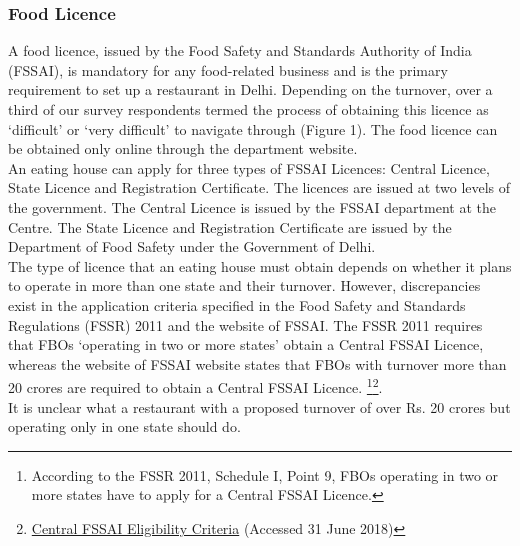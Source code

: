\documentclass[a4paper, 12pt]{article}
\begin{document}
                                        
                    \subsubsection{Food Licence}
                    A food licence, issued by the Food Safety and Standards Authority of India (FSSAI), is mandatory for any food-related business and is the primary requirement to set up a restaurant in Delhi. Depending on the turnover, over a third of our survey respondents termed the process of obtaining this licence as ‘difficult’ or ‘very difficult’ to navigate through (Figure 1). The food licence can be obtained only online through the department website.\\
                    An eating house can apply for three types of FSSAI Licences: Central Licence, State Licence and Registration Certificate. The licences are issued at two levels of the government. The Central Licence is issued by the FSSAI department at the Centre. The State Licence and Registration Certificate are issued by the Department of Food Safety under the Government of Delhi.\\
                    The type of licence that an eating house must obtain depends on whether it plans to operate in more than one state and their turnover. However, discrepancies exist in the application criteria specified in the Food Safety and Standards Regulations (FSSR) 2011 and the website of FSSAI. The FSSR 2011 requires that FBOs ‘operating in two or more states’ obtain a Central FSSAI Licence, whereas the website of FSSAI website states that FBOs with turnover more than 20 crores are required to obtain a Central FSSAI Licence. \footnote{According to the FSSR 2011, Schedule I, Point 9, FBOs operating in two or more states have to apply for a Central FSSAI Licence.}\footnote{\href{https://bit.ly/2pbFEXM}{Central FSSAI Eligibility Criteria} (Accessed 31 June 2018)}.\\%
                    It is unclear what a restaurant with a proposed turnover of over Rs. 20 crores but operating only in one state should do. %
                    
                    
\end{document}
